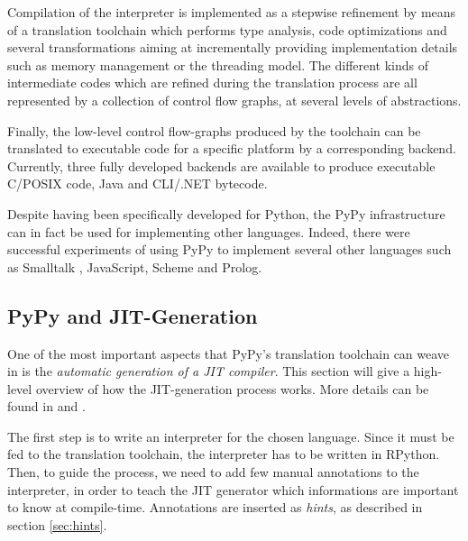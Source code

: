 Compilation of the interpreter is implemented as a stepwise
refinement by means of a translation toolchain which performs type
analysis, code optimizations and several transformations aiming at 
incrementally providing implementation details such as memory management or the threading model.
The different kinds of intermediate codes  which are refined 
during the translation process are all represented by a collection of control flow graphs,
at several levels of abstractions.

Finally, the low-level control flow-graphs produced by the toolchain
can be translated to executable code for a specific platform by a
corresponding backend.
Currently, three fully developed backends are available to produce
executable C/POSIX code, Java and CLI/.NET bytecode. 

Despite having been specifically developed for Python, the PyPy infrastructure
can in fact be used for implementing other languages. Indeed, there were
successful experiments of using PyPy to implement several other languages such
as Smalltalk \cite{BolzEtAl08}, JavaScript, Scheme and Prolog.


\subsection{PyPy and JIT-Generation}

One of the most important aspects that PyPy's translation toolchain can weave
in is the \emph{automatic generation of a JIT compiler}.  This section will
give a high-level overview of how the JIT-generation process works. More
details can be found in \cite{PyPyJIT} and \cite{PyPyJIT09}.

The first step is to write an interpreter for the chosen language.  Since it
must be fed to the translation toolchain, the interpreter has to be written in
RPython.  Then, to guide the process, we need to add few manual
annotations to the interpreter, in order to teach the JIT generator which
informations are important to know at compile-time.  Annotations are inserted
as \emph{hints}, as described in section \ref{sec:hints}.


